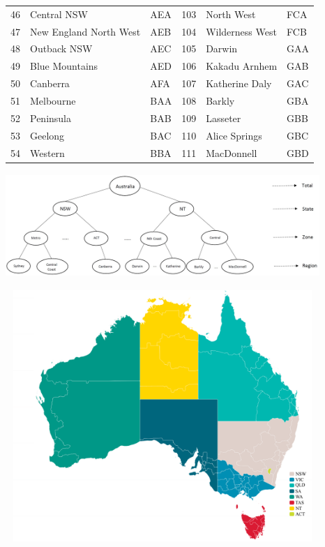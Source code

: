 \documentclass[11pt,a4paper,]{article}
\let\origfigure\figure
\let\endorigfigure\endfigure
\renewenvironment{figure}[1][2] {
    \expandafter\origfigure\expandafter[!htbp]
} {
    \endorigfigure
}
\begin{document}
\begin{longtable}[t]{rllrll}
46 & Central NSW & AEA & 103 & North West & FCA\\
47 & New England North West & AEB & 104 & Wilderness West & FCB\\
48 & Outback NSW & AEC & 105 & Darwin & GAA\\
49 & Blue Mountains & AED & 106 & Kakadu Arnhem & GAB\\
50 & Canberra & AFA & 107 & Katherine Daly & GAC\\
51 & Melbourne & BAA & 108 & Barkly & GBA\\
52 & Peninsula & BAB & 109 & Lasseter & GBB\\
53 & Geelong & BAC & 110 & Alice Springs & GBC\\
54 & Western & BBA & 111 & MacDonnell & GBD\\
\bottomrule
\end{longtable}
\endgroup{}

\begin{figure}

{\centering \includegraphics[width=450px,height=150px]{Paper-Figures/Australian_hierarchy_structure} 

}

\caption{Australian geographic hierarchical structure.}\label{fig:Australiahierarchystructure}
\end{figure}

\begin{figure}

{\centering \includegraphics[width=450px,height=360px]{Paper-Figures/ausTurRegions} 

}

\caption{Australia tourism region map - colors represent states.}\label{fig:Australiahierarchystructuremap}
\end{figure}
\end{document}

